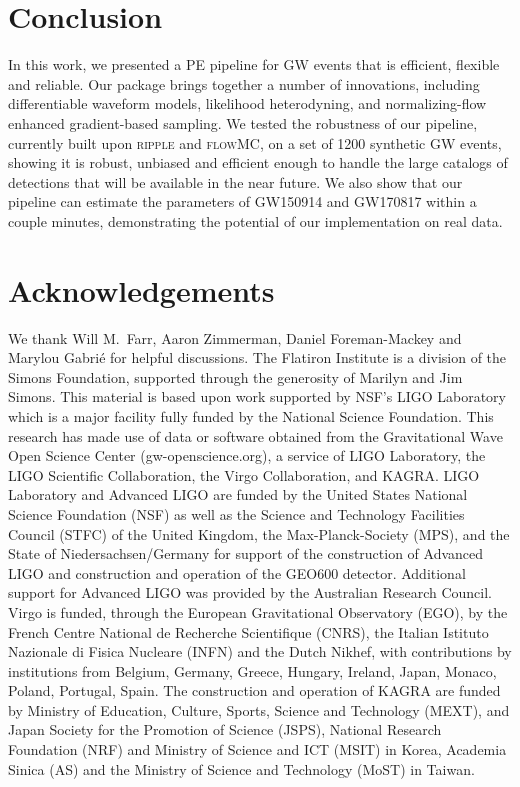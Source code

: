 \documentclass[twocolumn]{aastex631}
\begin{document}
\section{Conclusion}

In this work, we presented a PE pipeline for GW events that is efficient,
flexible and reliable. Our package brings together a number of innovations,
including differentiable waveform models, likelihood heterodyning, and
normalizing-flow enhanced gradient-based sampling. We tested the robustness of
our pipeline, currently built upon \textsc{ripple} and \textsc{flowMC}, on a
set of 1200 synthetic GW events, showing it is robust, unbiased and efficient
enough to handle the large catalogs of detections that will be available in the
near future. We also show that our pipeline can estimate the parameters of
GW150914 and GW170817 within a couple minutes, demonstrating the potential of our
implementation on real data.

\section{Acknowledgements}
We thank Will M.~Farr, Aaron Zimmerman, Daniel Foreman-Mackey and Marylou Gabri\'e for helpful discussions.
The Flatiron Institute is a division of the Simons Foundation, supported through the generosity of Marilyn and Jim Simons.
This material is based upon work supported by NSF's LIGO Laboratory which is a major facility fully funded by the National Science Foundation.
This research has made use of data or software obtained from the Gravitational Wave Open Science Center (gw-openscience.org), a service of LIGO Laboratory, the LIGO Scientific Collaboration, the Virgo Collaboration, and KAGRA. LIGO Laboratory and Advanced LIGO are funded by the United States National Science Foundation (NSF) as well as the Science and Technology Facilities Council (STFC) of the United Kingdom, the Max-Planck-Society (MPS), and the State of Niedersachsen/Germany for support of the construction of Advanced LIGO and construction and operation of the GEO600 detector. Additional support for Advanced LIGO was provided by the Australian Research Council. Virgo is funded, through the European Gravitational Observatory (EGO), by the French Centre National de Recherche Scientifique (CNRS), the Italian Istituto Nazionale di Fisica Nucleare (INFN) and the Dutch Nikhef, with contributions by institutions from Belgium, Germany, Greece, Hungary, Ireland, Japan, Monaco, Poland, Portugal, Spain. The construction and operation of KAGRA are funded by Ministry of Education, Culture, Sports, Science and Technology (MEXT), and Japan Society for the Promotion of Science (JSPS), National Research Foundation (NRF) and Ministry of Science and ICT (MSIT) in Korea, Academia Sinica (AS) and the Ministry of Science and Technology (MoST) in Taiwan.


\end{document}
